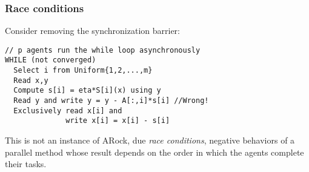 \documentclass[10pt,mathserif]{beamer}
\begin{document}
\begin{frame}[fragile]
\frametitle{Race conditions}

Consider removing the synchronization barrier:

\begin{lstlisting}
// p agents run the while loop asynchronously
WHILE (not converged)
  Select i from Uniform{1,2,...,m}
  Read x,y
  Compute s[i] = eta*S[i](x) using y
  Read y and write y = y - A[:,i]*s[i] //Wrong!
  Exclusively read x[i] and 
              write x[i] = x[i] - s[i]
\end{lstlisting}
This is not an instance of ARock, due \emph{race conditions}, negative behaviors of a parallel method whose result depends on the order in which the agents complete their tasks.
\end{frame}



\end{document}
